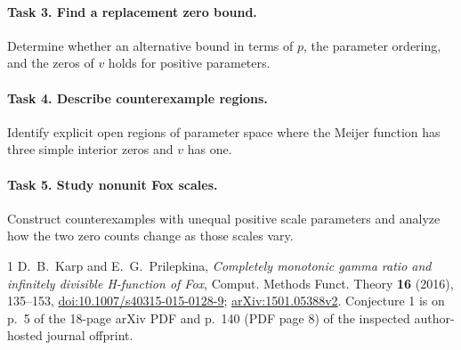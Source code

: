 \documentclass[10pt]{article}
\begin{document}
\paragraph{Task 3. Find a replacement zero bound.}
Determine whether an alternative bound in terms of \(p\), the
parameter ordering, and the zeros of \(v\) holds for positive parameters.

\paragraph{Task 4. Describe counterexample regions.}
Identify explicit open regions of parameter space where the
Meijer function has three simple interior zeros and \(v\) has one.

\paragraph{Task 5. Study nonunit Fox scales.}
Construct counterexamples with unequal positive scale parameters
and analyze how the two zero counts change as those scales vary.

\begin{thebibliography}{1}
 D.~B.~Karp and E.~G.~Prilepkina,
\emph{Completely monotonic gamma ratio and infinitely divisible
H-function of Fox}, Comput. Methods Funct. Theory \textbf{16}
(2016), 135--153,
\href{https://doi.org/10.1007/s40315-015-0128-9}
{doi:10.1007/s40315-015-0128-9};
\href{https://arxiv.org/abs/1501.05388}{arXiv:1501.05388v2}.
Conjecture 1 is on p.~5 of the 18-page arXiv PDF and p.~140
(PDF page 8) of the inspected author-hosted journal offprint.
\end{thebibliography}
\end{document}

